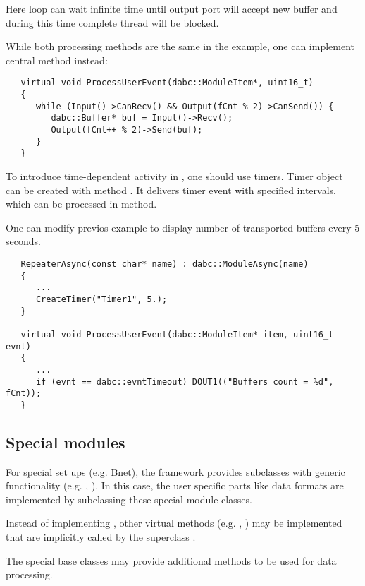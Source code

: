 Here  loop can wait infinite time until output port will accept new buffer
and during this time complete thread will be blocked. 

While both processing methods are the same in the example,  
one can implement central  method instead:  
 
\begin{small}
\begin{verbatim}
   virtual void ProcessUserEvent(dabc::ModuleItem*, uint16_t)
   {
      while (Input()->CanRecv() && Output(fCnt % 2)->CanSend()) {
         dabc::Buffer* buf = Input()->Recv();
         Output(fCnt++ % 2)->Send(buf);
      }
   }
\end{verbatim}
\end{small}

To introduce time-dependent activity in , 
one should use timers. Timer object can be created with method 
. It delivers timer event with specified intervals, 
which can be processed in  method.

One can modify previos example to display number of transported buffers
every 5 seconds.

\begin{small}
\begin{verbatim}
   RepeaterAsync(const char* name) : dabc::ModuleAsync(name)
   {
      ...
      CreateTimer("Timer1", 5.);
   }

   virtual void ProcessUserEvent(dabc::ModuleItem* item, uint16_t evnt)
   {
      ...
      if (evnt == dabc::evntTimeout) DOUT1(("Buffers count = %d", fCnt));  
   }
\end{verbatim}
\end{small}
   

\subsection{Special modules}
For special set ups (e.g. Bnet), the framework provides 
    subclasses with generic functionality 
   (e.g. , ). 
   In this case, the user specific parts like data formats are 
   implemented by subclassing these special module classes.

   
\begin{compactenum}
\item  Instead of implementing , other virtual 
      methods (e.g. , ) may be 
      implemented that are implicitly called by the superclass .
\item  The special base classes may provide additional 
      methods to be used for data processing.    
\end{compactenum}


